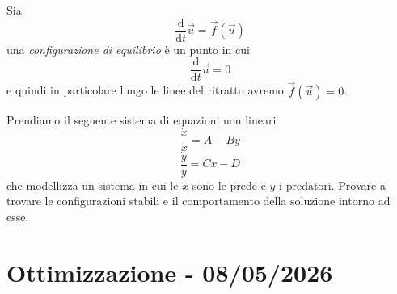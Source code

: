 \documentclass[11pt]{scrartcl}
\newcommand{\dif}{\text{d}}
\begin{document}
	\begin{definition}
		Sia 
		$$\frac{\dif }{\dif t}\vec{u}=\vec{f}\left(\vec{u}\right)$$
		una \textit{configurazione di equilibrio} è un punto in cui 
		$$\frac{\dif }{\dif t}\vec{u}=0$$
		e quindi in particolare lungo le linee del ritratto avremo $\vec{f}\left(\vec{u}\right)=0$.
	\end{definition}
	\begin{example}
		Prendiamo il seguente sistema di equazioni non lineari
		$$\frac{\dot{x}}{x}=A-By$$
		$$\frac{\dot{y}}{y}=Cx-D$$
		che modellizza un sistema in cui le $x$ sono le prede e $y$ i predatori. Provare a trovare le configurazioni stabili e il comportamento della soluzione intorno ad esse.
	\end{example}
	
	\newpage
	
	\section{Ottimizzazione - 08/05/2026}
	
\end{document}
